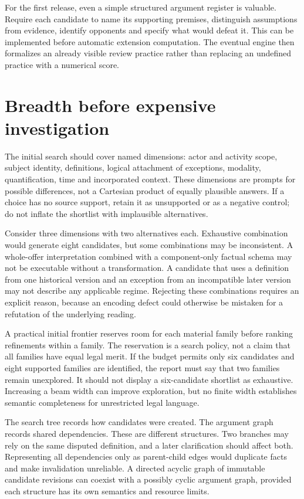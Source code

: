 \documentclass[12pt,a4paper,oneside,openany]{book}
\begin{document}
For the first release, even a simple structured argument register is valuable.
Require each candidate to name its supporting premises, distinguish assumptions
from evidence, identify opponents and specify what would defeat it. This can be
implemented before automatic extension computation. The eventual engine then
formalizes an already visible review practice rather than replacing an undefined
practice with a numerical score.

\section{Breadth before expensive investigation}
\label{merge:M05:06}


The initial search should cover named dimensions: actor and activity scope,
subject identity, definitions, logical attachment of exceptions, modality,
quantification, time and incorporated context. These dimensions are prompts for
possible differences, not a Cartesian product of equally plausible answers. If a
choice has no source support, retain it as unsupported or as a negative control;
do not inflate the shortlist with implausible alternatives.

Consider three dimensions with two alternatives each. Exhaustive combination
would generate eight candidates, but some combinations may be inconsistent. A
whole-offer interpretation combined with a component-only factual schema may not
be executable without a transformation. A candidate that uses a definition from
one historical version and an exception from an incompatible later version may
not describe any applicable regime. Rejecting these combinations requires an
explicit reason, because an encoding defect could otherwise be mistaken for a
refutation of the underlying reading.

A practical initial frontier reserves room for each material family before
ranking refinements within a family. The reservation is a search policy, not a
claim that all families have equal legal merit. If the budget permits only six
candidates and eight supported families are identified, the report must say that
two families remain unexplored. It should not display a six-candidate shortlist
as exhaustive. Increasing a beam width can improve exploration, but no finite
width establishes semantic completeness for unrestricted legal language.

The search tree records how candidates were created. The argument graph records
shared dependencies. These are different structures. Two branches may rely on
the same disputed definition, and a later clarification should affect both.
Representing all dependencies only as parent-child edges would duplicate facts
and make invalidation unreliable. A directed acyclic graph of immutable candidate
revisions can coexist with a possibly cyclic argument graph, provided each
structure has its own semantics and resource limits.
\end{document}
